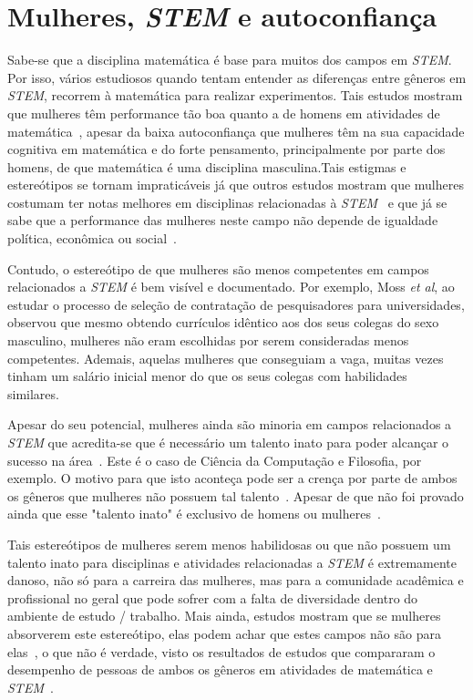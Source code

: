 \section{Mulheres, \emph{STEM} e autoconfiança}

Sabe-se que a disciplina matemática é base para muitos dos campos em \emph{STEM}. Por isso, vários estudiosos quando tentam entender as diferenças entre gêneros em \emph{STEM}, recorrem à matemática para realizar experimentos. Tais estudos mostram que mulheres têm performance tão boa quanto a de homens em atividades de matemática~\cite{hyde1990gender,campbell1986effects}, apesar da baixa autoconfiança que mulheres têm na sua capacidade cognitiva em matemática e do forte pensamento, principalmente por parte dos homens, de que matemática é uma disciplina masculina.Tais estigmas e estereótipos se tornam impraticáveis já que outros estudos mostram que mulheres costumam ter notas melhores em disciplinas relacionadas à \emph{STEM}~\cite{stoet2015sex} e que já se sabe que a performance das mulheres neste campo não depende de igualdade política, econômica ou social~\cite{stoet2015sex}. 

Contudo, o estereótipo de que mulheres são menos competentes em campos relacionados a \emph{STEM} é bem visível e documentado. Por exemplo, Moss \emph{et al}, ao estudar o processo de seleção de contratação de pesquisadores para universidades, observou que mesmo obtendo currículos idêntico aos dos seus colegas do sexo masculino, mulheres não eram escolhidas por serem consideradas menos competentes. Ademais, aquelas mulheres que conseguiam a vaga, muitas vezes tinham um salário inicial menor do que os seus colegas com habilidades similares.~\cite{moss2012science}

\bigskip

Apesar do seu potencial, mulheres ainda são minoria em campos relacionados a \emph{STEM} que acredita-se que é necessário um talento inato para poder alcançar o sucesso na área~\cite{leslie2015expectations}. Este é o caso de Ciência da Computação e Filosofia, por exemplo. O motivo para que isto aconteça pode ser a crença por parte de ambos os gêneros que mulheres não possuem tal talento~\cite{tiedemann2000gender,kirkcaldy2007parental}. Apesar de que não foi provado ainda que esse "talento inato" é exclusivo de homens ou mulheres~\cite{hyde2005gender}. 

Tais estereótipos de mulheres serem menos habilidosas ou que não possuem um talento inato para disciplinas e atividades relacionadas a \emph{STEM} é extremamente danoso, não só para a carreira das mulheres, mas para a comunidade acadêmica e profissional no geral que pode sofrer com a falta de diversidade dentro do ambiente de estudo / trabalho. Mais ainda, estudos mostram que se mulheres absorverem este estereótipo, elas podem achar que estes campos não são para elas~\cite{wigfield2000expectancy,shapiro2011major}, o que não é verdade, visto os resultados de estudos que compararam o desempenho de pessoas de ambos os gêneros em atividades de matemática e \emph{STEM}~\cite{stoet2015sex,hyde1990gender,campbell1986effects}.


